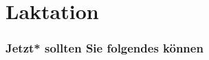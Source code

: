 \documentclass{beamer}
\begin{document}
\section{Laktation}







\begin{frame}

\frametitle{Jetzt* sollten Sie folgendes können}

\end{frame}



\end{document}
